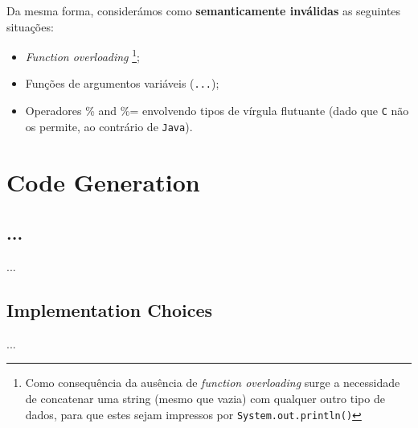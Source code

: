 \documentclass[a4paper]{article}
\begin{document}
Da mesma forma, considerámos como \textbf{semanticamente inválidas} as seguintes situações:
\begin{itemize}
	\item \textit{Function overloading} \footnote[1]{Como consequência da ausência de \textit{function overloading} surge a necessidade de concatenar
		uma string (mesmo que vazia) com qualquer outro tipo de dados, para que estes sejam impressos por \texttt{System.out.println()}};
	\item Funções de argumentos variáveis (\texttt{...});
	\item Operadores \% and \%= envolvendo tipos de vírgula flutuante (dado que \texttt{C} não os permite, ao contrário de \texttt{Java}).
\end{itemize}

\cleardoublepage

\section{Code Generation}
\subsection{...}
\indent \indent ...

\subsection{Implementation Choices}
\indent \indent ...

\cleardoublepage
\end{document}
